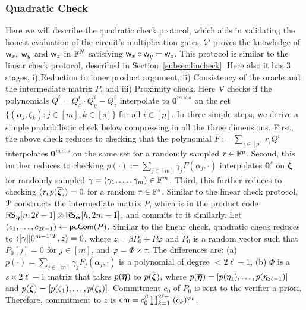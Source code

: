 \subsubsection{Quadratic Check}\label{subsec:quadcheck}
Here we will describe the quadratic check protocol, which aids in validating the honest evaluation of the circuit's multiplication gates. $\mathcal{P}$ proves the knowledge of $\mathsf{w}_x, \; \mathsf{w}_y$ and $\mathsf{w}_z$ in $\mathbb{F}^N$ satisfying $\mathsf{w}_x \circ \mathsf{w}_y = \mathsf{w}_z$. This protocol is similar to the linear check protocol, described in Section~\ref{subsec:lincheck}. Here also it has 3 stages, i) Reduction to inner product argument, ii) Consistency of the oracle and the intermediate matrix $P$, and iii) Proximity check.
Here $\mathcal{V}$ checks if the polynomials $Q^i = Q^i_x \cdot Q^i_y - Q^i_z$ interpolate to ${\bm 0}^{m \times s}$ on the set $\{(\alpha_j, \zeta_k): j \in [m], k \in [s] \}$ for all $i \in [p]$. In three simple steps, we derive a simple probabilistic check below compressing in all the three dimensions. 
First, the above check reduces to   checking  that the polynomial $F := \sum_{i\in [p]}r_iQ^i$ interpolates $\bm{0}^{m\times s}$ on the same set for a randomly sampled $r\in \mathbb{F}^p$. 
Second, this further reduces to checking $p(\cdot) := \sum_{j\in [m]}\gamma_jF(\alpha_j,\cdot)$ interpolates $\bm{0}^s$ on $\overline{\bm{\zeta}}$ for randomly sampled $\gamma=(\gamma_1,\ldots,\gamma_m)\in \mathbb{F}^m$.
Third, this further reduces to checking $\langle \tau,p(\overline{\bm{\zeta}})\rangle=0$ for a random $\tau\in \mathbb{F}^s$. 
Similar to the linear check protocol, $\mathcal{P}$ constructs the intermediate matrix $P$, which is in the product code $\mathsf{RS}_{\bm{\eta}}[n,2\ell-1]\otimes \mathsf{RS}_{\bm{\alpha}}[h,2m-1]$, and commits to it similarly. Let $(c_1, \ldots, c_{2\ell-1}) \leftarrow \mathsf{pcCom}(P)$. Similar to the linear check, quadratic check reduces to $\langle [\gamma || 0^{m-1}]^T,z\rangle = 0$, where $z = \beta P_0 + \overline{P} \varphi$ and $P_0$ is a random vector such that $P_0[j] = 0$ for $j \in [m]$, and $\varphi = \Phi \times \tau$. The differences are: (a) $p(\cdot) = \sum_{j\in[m]}\gamma_j F_j(\alpha_j,\cdot)$ is a polynomial of degree $<2\ell-1$, (b) $\Phi$ is a $s \times 2\ell -1$ matrix that takes $p(\overline{\bm{\eta}})$ to $p(\overline{\bm{\zeta}})$, where $p(\overline{\bm{\eta}}) = [p(\eta_1),\ldots, p(\eta_{2\ell-1})]$ and $p(\overline{\bm{\zeta}}) = [p(\zeta_1),\ldots, p(\zeta_{s})]$. Commitment $c_0$ of $P_0$ is sent to the verifier a-priori. Therefore, commitment to $z$ is $\mathsf{cm} = c_0^{\beta} \prod_{k=1}^{2\ell-1} (c_k)^{\varphi_k}$.

\smallskip


